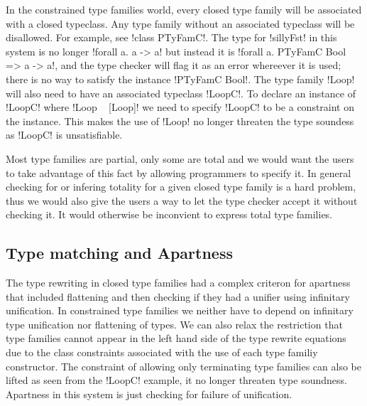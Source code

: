 \documentclass[format=sigplan,manuscript,review,screen,nonacm,margin=1in]{acmart}
\begin{document}
In the constrained type families world, every closed type family will be associated with
a closed typeclass. Any type family without an associated typeclass will be disallowed.
For example, see !class PTyFamC!. The type for !sillyFst! in this system is no longer
!forall a. a -> a! but instead it is !forall a. PTyFamC Bool => a -> a!, and the type
checker will flag it as an error whereever it is used; there is no way to satisfy
the instance !PTyFamC Bool!. The type family !Loop! will also need to have
an associated typeclass !LoopC!. To declare an instance of !LoopC!
where !Loop ~ [Loop]! we need to specify !LoopC! to be a constraint on the instance.
This makes the use of !Loop! no longer threaten the type soundess as !LoopC! is unsatisfiable.

Most type families are partial, only some are total and we would want
the users to take advantage of this fact by allowing programmers to specify it.
In general checking for or infering totality for a given closed type family is a hard problem, thus
we would also give the users a way to let the type checker accept it without checking it.
It would otherwise be inconvient to express total type families. 

\subsection{Type matching and Apartness}
The type rewriting in closed type families had a complex criteron for apartness that included
flattening and then checking if they had a unifier using infinitary unification. In constrained type families
we neither have to depend on infinitary type unification nor flattening of types. We can
also relax the restriction that type families cannot appear in the left hand side
of the type rewrite equations due to the class constraints associated with
the use of each type familiy constructor. The constraint of allowing only terminating
type families can also be lifted as seen from the !LoopC! example, it no longer
threaten type soundness. Apartness in this system is just checking for failure of unification.
\end{document}
